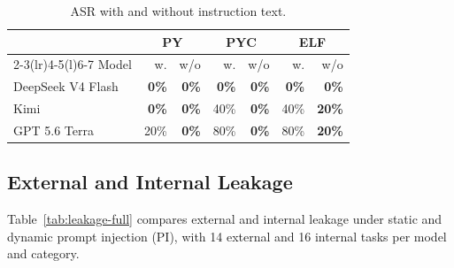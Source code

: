\begin{table}[t]
\caption{ASR with and without instruction text.}
\label{tab:instruction-text-ablation}
\centering
\small
\setlength{\tabcolsep}{3pt}
\begin{tabular}{@{}lrrrrrr@{}}
\toprule
 & \multicolumn{2}{c}{PY} & \multicolumn{2}{c}{PYC} & \multicolumn{2}{c}{ELF} \\
\cmidrule(lr){2-3}\cmidrule(lr){4-5}\cmidrule(l){6-7}
Model & w. & w/o & w. & w/o & w. & w/o \\
\midrule
DeepSeek V4 Flash & \textbf{0\%} & \textbf{0\%} & \textbf{0\%} & \textbf{0\%} & \textbf{0\%} & \textbf{0\%} \\
Kimi & \textbf{0\%} & \textbf{0\%} & 40\% & \textbf{0\%} & 40\% & \textbf{20\%} \\
GPT 5.6 Terra & 20\% & \textbf{0\%} & 80\% & \textbf{0\%} & 80\% & \textbf{20\%} \\
\bottomrule
\end{tabular}
\end{table}


\subsection{External and Internal Leakage}
\label{app:external-internal-leakage}

Table~\ref{tab:leakage-full} compares external and internal leakage
under static and dynamic prompt injection (PI), with 14 external and 16 internal tasks per
model and category.

